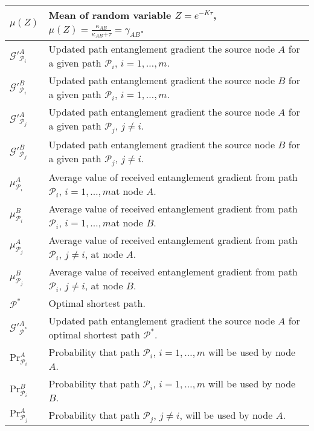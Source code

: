 \documentclass[11pt]{article}%
\begin{document}
\begin{longtable}{|p{1.6in}|p{2.8in}|}
$\mu \left(Z\right)$ & Mean of random variable $Z\mathrm{=}e^{\mathrm{-}K\tau }$,\newline   $\mu \left(Z\right)\mathrm{=}\frac{{\kappa }_{AB}}{{\kappa }_{AB}\mathrm{+}\tau }\mathrm{=}{\gamma }_{AB}$. \\ \hline 
${\mathcal{G}}'^A_{{\mathcal{P}}_i}$ & Updated path entanglement gradient the source node $A$ for a given path ${\mathcal{P}}_i$, $i\mathrm{=1,\dots ,}m$. \\ \hline 
${\mathcal{G}}'^B_{{\mathcal{P}}_i}$ & Updated path entanglement gradient the source node $B$ for a given path ${\mathcal{P}}_i$, $i\mathrm{=1,\dots ,}m$. \\ \hline 
${\mathcal{G}}'^A_{{\mathcal{P}}_j}$ & Updated path entanglement gradient the source node $A$ for a given path ${\mathcal{P}}_j$, $j\mathrm{\ne }i$. \\ \hline 
${\mathcal{G}}'^B_{{\mathcal{P}}_j}$ & Updated path entanglement gradient the source node $B$ for a given path ${\mathcal{P}}_j$, $j\mathrm{\ne }i$. \\ \hline 
${\mu }^A_{{\mathcal{P}}_i}$ & Average value of received entanglement gradient from path ${\mathcal{P}}_i$, $i\mathrm{=1,\dots ,}m$at node $A$. \\ \hline 
${\mu }^B_{{\mathcal{P}}_i}$ & Average value of received entanglement gradient from path ${\mathcal{P}}_i$, $i\mathrm{=1,\dots ,}m$at node $B$. \\ \hline 
${\mu }^A_{{\mathcal{P}}_j}$ & Average value of received entanglement gradient from path ${\mathcal{P}}_i$, $j\mathrm{\ne }i$, at node $A$. \\ \hline 
${\mu }^B_{{\mathcal{P}}_j}$ & Average value of received entanglement gradient from path ${\mathcal{P}}_i$, $j\mathrm{\ne }i$, at node $B$. \\ \hline 
${\mathcal{P}}^{\mathrm{*}}$ & Optimal shortest path. \\ \hline 
${\mathcal{G}}'^A_{{\mathcal{P}}^{\mathrm{*}}}$ & Updated path entanglement gradient the source node $A$ for optimal shortest path ${\mathcal{P}}^{\mathrm{*}}$. \\ \hline 
$\mathrm{P}{\mathrm{r}}^A_{{\mathcal{P}}_i}$ & Probability that path ${\mathcal{P}}_i$, $i\mathrm{=1,\dots ,}m$ will be used by node $A$.  \\ \hline 
$\mathrm{P}{\mathrm{r}}^B_{{\mathcal{P}}_i}$ & Probability that path ${\mathcal{P}}_i$, $i\mathrm{=1,\dots ,}m$ will be used by node $B$. \\ \hline 
$\mathrm{P}{\mathrm{r}}^A_{{\mathcal{P}}_j}$ & Probability that path ${\mathcal{P}}_j$, $j\mathrm{\ne }i$, will be used by node $A$. \\ \hline 

\end{longtable}
\end{document}
